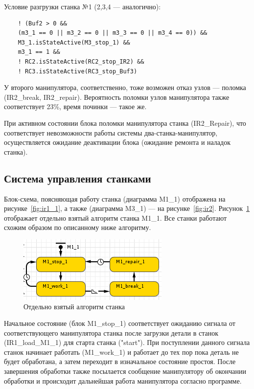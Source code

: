 Условие разгрузки станка №1 (2,3,4 --- аналогично):

\begin{verbatim}
    ! (Buf2 > 0 &&
    (m3_1 == 0 || m3_2 == 0 || m3_3 == 0 || m3_4 == 0)) &&
    M3_1.isStateActive(M3_stop_1) &&
    m3_1 == 1 &&
    ! RC2.isStateActive(RC2_stop_IR2) &&
    ! RC3.isStateActive(RC3_stop_Buf3)
\end{verbatim}

У второго манипулятора, соответственно, тоже возможен отказ узлов --- поломка (IR2\_break, IR2\_repair). Вероятность поломки узлов манипулятора также соответствует 23\%, время починки --- такое же.

При активном состоянии блока поломки манипулятора станка (IR2\_Repair), что соответствует невозможности работы системы два-станка-манипулятор, осуществляется ожидание деактивации блока (ожидание ремонта и наладок станка).

\subsection{Система управления станками}

Блок-схема, поясняющая работу станка (диаграмма M1\_1) отображена на рисунке~\ref{fig:ir1_1}, а также (диаграмма M3\_1) --- на рисунке~\ref{fig:ir2}. Рисунок~\ref{fig:m} отображает отдельно взятый алгоритм станка M1\_1. Все станки работают схожим образом по описанному ниже алгоритму.

\begin{figure}[ht]
    \includegraphics[width=.5\linewidth]{Figures/m.png}
    \caption{Отдельно взятый алгоритм станка}
    \label{fig:m}
\end{figure}

Начальное состояние (блок M1\_stop\_1) соответствует ожиданию сигнала от соответствующего манипулятора станка после загрузки детали в станок (IR1\_load\_M1\_1) для старта станка ("start"). При поступлении данного сигнала станок начинает работать (M1\_work\_1) и работает до тех пор пока деталь не будет обработана, а затем переходит в изначальное состояние простоя. После завершения обработки также посылается сообщение манипулятору об окончании обработки и происходит дальнейшая работа манипулятора согласно программе.

